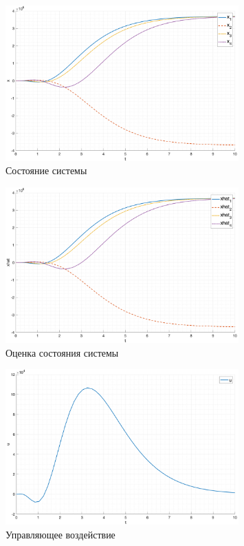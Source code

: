 \begin{figure}[ht!]
    \centering
    \includegraphics[width=0.8\textwidth]{media/plots/task3_x_1.png}
    \caption{Состояние системы}
    \label{fig:task3_x}
\end{figure}

\begin{figure}[ht!]
    \centering
    \includegraphics[width=0.8\textwidth]{media/plots/task3_xhat_1.png}
    \caption{Оценка состояния системы}
    \label{fig:task3_xhat}
\end{figure}

\begin{figure}[ht!]
    \centering
    \includegraphics[width=0.8\textwidth]{media/plots/task3_u_1.png}
    \caption{Управляющее воздействие}
    \label{fig:task3_u}
\end{figure}


